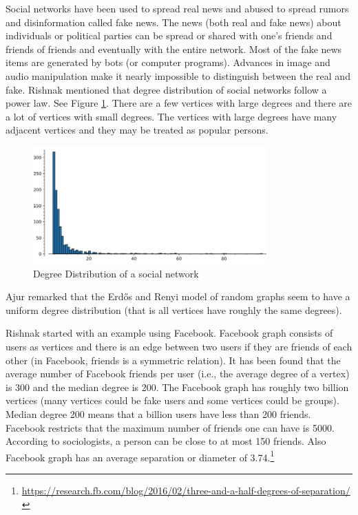  Social networks have been used to spread real news and abused to spread rumors and disinformation called fake news. The news (both real and fake news) about individuals or political parties can be spread or shared with
 one's friends and friends of friends and eventually with the entire network. Most of the fake news items are  generated by bots (or computer programs). Advances in image and audio manipulation make it nearly impossible to distinguish between the real and fake. 
 Rishnak mentioned that degree distribution of social networks follow a power law. See Figure \ref{21p1}.  There are a few vertices with large degrees and there are a lot of vertices with small degrees.  The vertices with large degrees have many adjacent vertices and they may be treated as popular persons.
 \begin{figure}
 \begin{center}
\includegraphics[width=0.8\textwidth]{degreepowerlawdist.jpg}
\caption{Degree Distribution of a social network}\label{21p1}
\end{center}

\end{figure}
\begin{newpage}
\end{newpage}
 
 Ajur remarked that the Erd\H{o}s and Renyi model of random graphs seem to have a uniform degree distribution (that is all vertices have roughly the same degrees).
 
 Rishnak started with an example using Facebook. Facebook graph consists of users as vertices and there is an edge between two users if they are friends of each other (in Facebook, friends is a symmetric relation). It has been
  found that the average number of Facebook friends per user (i.e., the average degree of a vertex) is 300 and the median degree is 200. The Facebook graph has roughly two billion vertices (many vertices could be fake users and some vertices could be groups). Median degree 200 means that a billion users have less than 200 friends. Facebook restricts that the maximum number of friends one can have is 5000. According to sociologists, a person can be close to at most 150 friends. Also Facebook graph has an average separation or diameter of 3.74.\footnote{\url{https://research.fb.com/blog/2016/02/three-and-a-half-degrees-of-separation/}}
 
